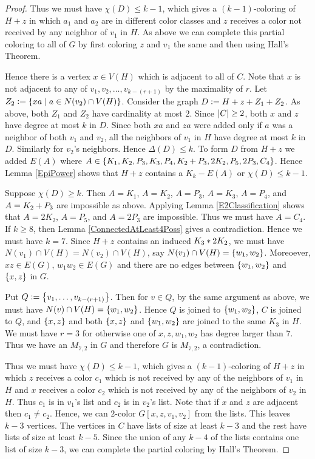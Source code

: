 \begin{proof}
Thus we must have $\chi(D) \leq k - 1$, which gives a $(k -
1)$-coloring of $H + z$ in which $a_1$ and $a_2$ are in different color classes
and $z$ receives a color not received by any neighbor of $v_1$ in $H$.  As
above we can complete this partial coloring to all of $G$ by first coloring $z$
and $v_1$ the same and then using Hall's Theorem.

Hence there is a vertex $x \in V(H)$ which is adjacent to all of $C$.  
Note that $x$ is not adjacent to any of $v_1, v_2, \ldots, v_{k - (r + 1)}$ by the maximality of $r$. 
Let $Z_2 \mathrel{\mathop:}= \left\{ xa \mid a \in N(v_2) \cap V(H) \right\}$.  Consider the graph 
$D \mathrel{\mathop:}= H + z + Z_1 + Z_2$.  As above, both $Z_1$ and $Z_2$ have
cardinality at most $2$.  Since $\left|C\right| \geq 2$, both $x$ and $z$ have degree at most $k$ in $D$.  
Since both $xa$ and $za$ were added only if $a$ was a neighbor of both $v_1$ and $v_2$, 
all the neighbors of $v_1$ in $H$ have degree at most $k$ in $D$. Similarly for $v_2$'s neighbors.  
Hence $\Delta(D) \leq k$. 
To form $D$ from $H + z$ we added $E(A)$ where $A
\in \left\{ K_1, K_2, P_3, K_3, P_4, K_2 \mbox{\hspace{2 pt}$+$\hspace{2 pt}} P_3, 2K_2, P_5, 2P_3, C_4 \right\}$. 
Hence Lemma \ref{EpiPower} shows that $H + z$ contains a $K_k - E(A)$ or $\chi(D) \leq k - 1$.  

Suppose $\chi(D) \geq k$. Then $A = K_1$, $A = K_2$, $A = P_3$, $A =
K_3$, $A = P_4$, and $A = K_2 \mbox{\hspace{2 pt}$+$\hspace{2 pt}} P_3$ are impossible as above.  
Applying Lemma \ref{E2Classification} shows that $A = 2K_2$, $A = P_5$, and 
$A = 2P_3$ are impossible.  Thus we must have $A = C_4$.  If $k \geq 8$, then 
Lemma \ref{ConnectedAtLeast4Poss} gives a contradiction.  Hence we must have
$k = 7$. 
Since $H + z$ contains an induced $K_3 \mbox{\hspace{2 pt}$\ast$\hspace{2 pt}} 2K_2$, we must have $N(v_1) \cap
V(H) = N(v_2) \cap V(H)$, say $N(v_1) \cap V(H) = \left\{ w_1, w_2 \right\}$.  Moreoever,
$xz \in E(G)$, $w_1w_2 \in E(G)$ and there are no edges between $\left\{ w_1, w_2 \right\}$
and $\left\{ x, z \right\}$ in $G$.  

Put $Q \mathrel{\mathop:}= \left\{ v_1, \ldots, v_{k - (r + 1)} \right\}$. Then for $v \in Q$, by
the same argument as above, we must have $N(v) \cap V(H) = \left\{ w_1, w_2 \right\}$. 
Hence $Q$ is joined to $\left\{ w_1, w_2 \right\}$, $C$ is joined to $Q$, and $\left\{ x, z \right\}$
and both $\left\{ x, z \right\}$ and $\left\{ w_1, w_2 \right\}$ are joined to the same $K_3$ in $H$. 
We must have $r = 3$ for otherwise one of $x, z, w_1, w_2$ has degree larger
than $7$.  Thus we have an $M_{7, 2}$ in $G$ and therefore $G$ is $M_{7,2}$, a
contradiction.

Thus we must have $\chi(D) \leq k - 1$, which gives a $(k - 1)$-coloring of $H + z$ in which $z$ receives a color $c_1$ which is not received by any of the 
neighbors of $v_1$ in $H$ and $x$ receives a color $c_2$ which is not received by any of the neighbors of $v_2$ in $H$.  
Thus $c_1$ is in $v_1$'s list and $c_2$ is in $v_2$'s list. Note that if $x$ and $z$ are adjacent then $c_1 \neq c_2$. Hence, we can $2$-color $G[x,z,v_1,v_2]$ from the lists.  
This leaves $k-3$ vertices. The vertices in $C$ have lists of size at least $k-3$ and the rest have lists of size at least $k-5$.  
Since the union of any $k-4$ of the lists contains one list of size $k-3$, we
can complete the partial coloring by Hall's Theorem.
\end{proof}

